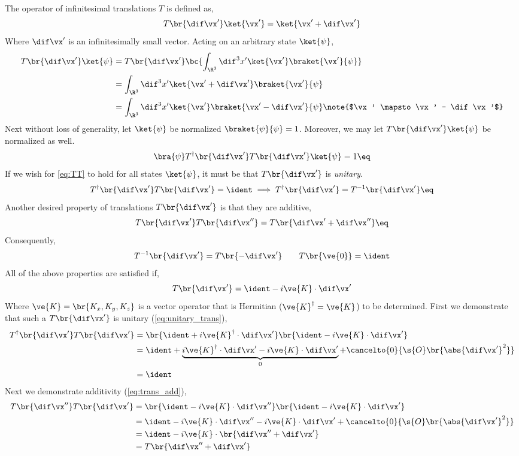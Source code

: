\documentclass{article}
\begin{document}
The operator of infinitesimal translations $T$ is defined as,
\[ T\br{\dif \vx'}\ket{\vx'} = \ket{\vx' + \dif \vx'} \]
Where $\dif \vx'$ is an infinitesimally small vector. Acting on an arbitrary state $\ket{\psi}$,
\begin{align*}
T\br{\dif \vx'}\ket{\psi} &= T\br{\dif \vx'} \bc{\int_{\R^3} \dif^3 x' \ket{\vx'} \braket{\vx'}{\psi}} \\
&= \int_{\R^3} \dif^3 x' \ket{\vx' + \dif \vx'} \braket{\vx'}{\psi} \\
&= \int_{\R^3} \dif^3 x' \ket{\vx'} \braket{\vx' - \dif \vx'}{\psi} \note{$\vx' \mapsto \vx' - \dif \vx'$}\\
\end{align*}
Next without loss of generality, let $\ket{\psi}$ be normalized $\braket{\psi}{\psi} = 1$. Moreover, we may let $T\br{\dif \vx'}\ket{\psi}$ be normalized as well.
\[ \bra{\psi}T^{\dagger}\br{\dif \vx'} T\br{\dif \vx'}\ket{\psi} = 1 \eq \label{eq:TT}\]
If we wish for \cref{eq:TT} to hold for all states $\ket{\psi}$, it must be that $T\br{\dif \vx'}$ is \textit{unitary}.
\[ T^{\dagger}\br{\dif \vx'} T\br{\dif \vx'} = \ident \implies T^{\dagger}\br{\dif \vx'} = T^{-1}\br{\dif \vx'} \eq\label{eq:unitary_trans}\]
Another desired property of translations $T\br{\dif \vx'}$ is that they are additive,
\[ T\br{\dif \vx'}T\br{\dif \vx''} = T\br{\dif \vx' + \dif \vx''} \eq \label{eq:trans_add}\]
Consequently,
\[ T^{-1}\br{\dif \vx'} = T\br{-\dif \vx'} \qquad T\br{\ve{0}} = \ident \]
All of the above properties are satisfied if,
\[ T\br{\dif \vx'} = \ident - i \ve{K} \cdot \dif \vx' \]
Where $\ve{K} = \br{K_x, K_y, K_z}$ is a vector operator that is Hermitian ($\ve{K}^{\dagger} = \ve{K}$) to be determined. First we demonstrate that such a $T\br{\dif \vx'}$ is unitary (\cref{eq:unitary_trans}),
\begin{align*}
T^{\dagger}\br{\dif \vx'} T\br{\dif \vx'} &= \br{\ident + i \ve{K}^{\dagger} \cdot \dif \vx'}\br{\ident - i \ve{K} \cdot \dif \vx'} \\
&= \ident + \underbrace{i \ve{K}^{\dagger} \cdot \dif \vx' - i \ve{K} \cdot \dif \vx'}_{0} + \cancelto{0}{\s{O}\br{\abs{\dif \vx'}^2}} \\
&= \ident
\end{align*}
Next we demonstrate additivity (\cref{eq:trans_add}),
\begin{align*}
T\br{\dif \vx''} T\br{\dif \vx'} &= \br{\ident - i \ve{K} \cdot \dif \vx''}\br{\ident - i \ve{K} \cdot \dif \vx'} \\
&= \ident - i \ve{K} \cdot \dif \vx'' - i \ve{K} \cdot \dif \vx' + \cancelto{0}{\s{O}\br{\abs{\dif \vx'}^2}} \\
&= \ident - i \ve{K} \cdot \br{\dif \vx'' + \dif \vx'} \\
&= T\br{\dif \vx'' + \dif \vx'}
\end{align*}
\end{document}
